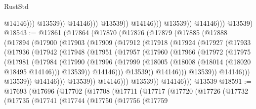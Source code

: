 \begin{lexlean}{RustStd}
\begin{coremodule}
                                          @14146)))
                                    @13539))
                                @14146)))
                          @13539))
                      @14146)))
                @13539))
            @14146)))
      @13539)
@18543 := @17861
    (@17864
      (@17870
        (@17876
          (@17879
            (@17885
              (@17888
                (@17894
                  (@17900
                    (@17903
                      (@17909
                        (@17912
                          (@17918
                            (@17924
                              (@17927
                                (@17933
                                  (@17936
                                    (@17942
                                      (@17948
                                        (@17951
                                          (@17957
                                            (@17960
                                              (@17966
                                                (@17972
                                                  (@17975
                                                    (@17981
                                                      (@17984
                                                        (@17990
                                                          (@17996
                                                            (@17999
                                                              (@18005
                                                                (@18008
                                                                  (@18014 (@18020 @18495 @14146)))
                                                                @13539))
                                                            @14146)))
                                                      @13539))
                                                  @14146)))
                                            @13539))
                                        @14146)))
                                  @13539))
                              @14146)))
                        @13539))
                    @14146)))
              @13539))
          @14146)))
    @13539
@18591 := @17693
    (@17696
      (@17702
        (@17708
          (@17711
            (@17717
              (@17720
                (@17726
                  (@17732
                    (@17735
                      (@17741
                        (@17744
                          (@17750
                            (@17756
                              (@17759

\end{coremodule}
\end{lexlean}

